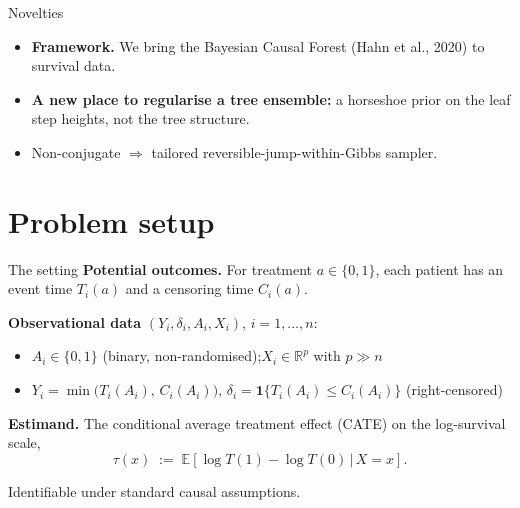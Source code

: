 \documentclass[10pt,aspectratio=169]{beamer}
\newcommand{\E}{\mathbb{E}}
\newcommand{\R}{\mathbb{R}}
\begin{document}
\begin{frame}{Novelties}
\begin{itemize}
  \item \textbf{Framework.} We bring the Bayesian Causal Forest (Hahn et al., 2020) to survival data.
  \vspace{0.7cm}
  \item \textbf{A new place to regularise a tree ensemble:} a \alert{horseshoe prior on the leaf step heights}, not the tree structure.
  \vspace{0.7cm}
  \item Non-conjugate $\Rightarrow$ tailored \alert{reversible-jump-within-Gibbs} sampler.
\end{itemize}
\end{frame}

\section{Problem setup}

\begin{frame}{The setting}
\textbf{Potential outcomes.} For treatment $a \in \{0,1\}$, each patient has an event time $T_i(a)$ and a censoring time $C_i(a)$.

\vspace{0.3cm}

\textbf{Observational data} $(Y_i, \delta_i, A_i, X_i)$, $i = 1,\ldots,n$:
\begin{itemize}
  \item $A_i \in \{0,1\}$ \;(binary, non-randomised);\quad $X_i \in \R^p$ with $p \gg n$
  \item $Y_i = \min\bigl(T_i(A_i),\, C_i(A_i)\bigr)$,\;\; $\delta_i = \mathbf{1}\{T_i(A_i) \le C_i(A_i)\}$ \;(right-censored)
\end{itemize}

\vspace{0.8cm}

\textbf{Estimand.} The conditional average treatment effect (CATE) on the log-survival scale,
\[
\tau(x) \;:=\; \E\left[\log T(1) - \log T(0)\,\big|\, X = x\right].
\]
\begin{center}
{\footnotesize\color{black!55} Identifiable under standard causal assumptions.}
\end{center}
\end{frame}
\end{document}
